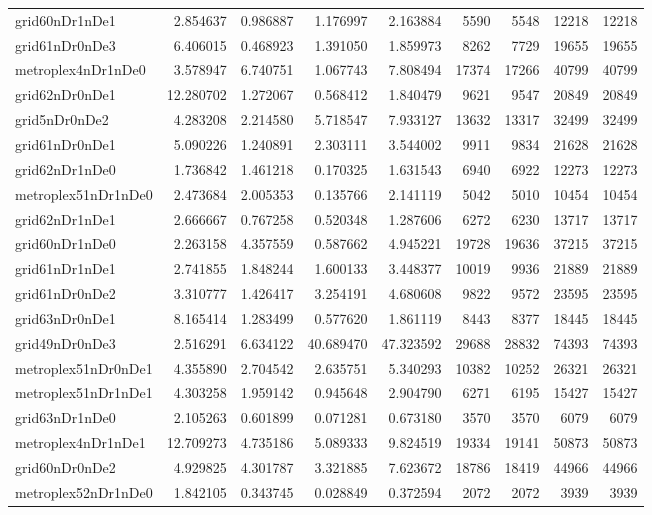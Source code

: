 \begin{longtable}{|l|r|r|r|r|r|r|r|r|}
grid60nDr1nDe1 & 2.854637 & 0.986887 & 1.176997 & 2.163884 & 5590 & 5548 & 12218 & 12218 \\
grid61nDr0nDe3 & 6.406015 & 0.468923 & 1.391050 & 1.859973 & 8262 & 7729 & 19655 & 19655 \\
metroplex4nDr1nDe0 & 3.578947 & 6.740751 & 1.067743 & 7.808494 & 17374 & 17266 & 40799 & 40799 \\
grid62nDr0nDe1 & 12.280702 & 1.272067 & 0.568412 & 1.840479 & 9621 & 9547 & 20849 & 20849 \\
grid5nDr0nDe2 & 4.283208 & 2.214580 & 5.718547 & 7.933127 & 13632 & 13317 & 32499 & 32499 \\
grid61nDr0nDe1 & 5.090226 & 1.240891 & 2.303111 & 3.544002 & 9911 & 9834 & 21628 & 21628 \\
grid62nDr1nDe0 & 1.736842 & 1.461218 & 0.170325 & 1.631543 & 6940 & 6922 & 12273 & 12273 \\
metroplex51nDr1nDe0 & 2.473684 & 2.005353 & 0.135766 & 2.141119 & 5042 & 5010 & 10454 & 10454 \\
grid62nDr1nDe1 & 2.666667 & 0.767258 & 0.520348 & 1.287606 & 6272 & 6230 & 13717 & 13717 \\
grid60nDr1nDe0 & 2.263158 & 4.357559 & 0.587662 & 4.945221 & 19728 & 19636 & 37215 & 37215 \\
grid61nDr1nDe1 & 2.741855 & 1.848244 & 1.600133 & 3.448377 & 10019 & 9936 & 21889 & 21889 \\
grid61nDr0nDe2 & 3.310777 & 1.426417 & 3.254191 & 4.680608 & 9822 & 9572 & 23595 & 23595 \\
grid63nDr0nDe1 & 8.165414 & 1.283499 & 0.577620 & 1.861119 & 8443 & 8377 & 18445 & 18445 \\
grid49nDr0nDe3 & 2.516291 & 6.634122 & 40.689470 & 47.323592 & 29688 & 28832 & 74393 & 74393 \\
metroplex51nDr0nDe1 & 4.355890 & 2.704542 & 2.635751 & 5.340293 & 10382 & 10252 & 26321 & 26321 \\
metroplex51nDr1nDe1 & 4.303258 & 1.959142 & 0.945648 & 2.904790 & 6271 & 6195 & 15427 & 15427 \\
grid63nDr1nDe0 & 2.105263 & 0.601899 & 0.071281 & 0.673180 & 3570 & 3570 & 6079 & 6079 \\
metroplex4nDr1nDe1 & 12.709273 & 4.735186 & 5.089333 & 9.824519 & 19334 & 19141 & 50873 & 50873 \\
grid60nDr0nDe2 & 4.929825 & 4.301787 & 3.321885 & 7.623672 & 18786 & 18419 & 44966 & 44966 \\
metroplex52nDr1nDe0 & 1.842105 & 0.343745 & 0.028849 & 0.372594 & 2072 & 2072 & 3939 & 3939 \\

\end{longtable}

